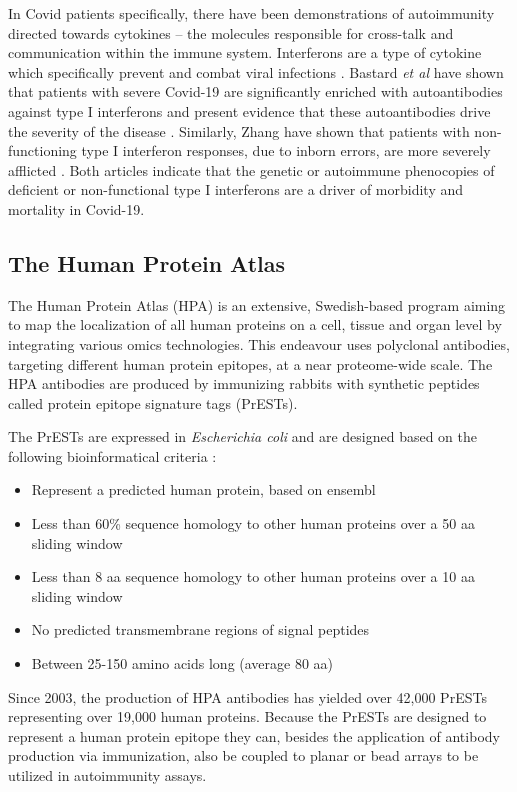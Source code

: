 \documentclass{article}
\begin{document}
In Covid patients specifically, there have been demonstrations of autoimmunity directed towards cytokines – the molecules responsible for cross-talk and communication within the immune system. Interferons are a type of cytokine which specifically prevent and combat viral infections \cite{ifn}. Bastard \textit{et al} have shown that patients with severe Covid-19 are significantly enriched with autoantibodies against type I interferons and present evidence that these autoantibodies drive the severity of the disease \cite{bastard}. Similarly, Zhang  have shown that patients with non-functioning type I interferon responses, due to inborn errors, are more severely afflicted \cite{zhang_inborn_2020}. Both articles indicate that the genetic or autoimmune phenocopies of deficient or non-functional type I interferons are a driver of morbidity and mortality in Covid-19.

\subsection{The Human Protein Atlas}
The Human Protein Atlas (HPA) \cite{hpa} is an extensive, Swedish-based program aiming to map the localization of all human proteins on a cell, tissue and organ level by integrating various omics technologies. This endeavour uses polyclonal antibodies, targeting different human protein epitopes, at a near proteome-wide scale. The HPA antibodies are produced by immunizing rabbits with synthetic peptides called protein epitope signature tags (PrESTs). 

The PrESTs are expressed in \textit{Escherichia coli} and are designed based on the following bioinformatical criteria \cite{prest}:

\begin{itemize}
    \item Represent a predicted human protein, based on ensembl \cite{ensembl}
    \item Less than 60\% sequence homology to other human proteins over a 50 aa sliding window
    \item Less than 8 aa sequence homology to other human proteins over a 10 aa sliding window
    \item No predicted transmembrane regions of signal peptides
    \item Between 25-150 amino acids long (average 80 aa)
\end{itemize}

Since 2003, the production of HPA antibodies has yielded over 42,000 PrESTs representing over 19,000 human proteins. Because the PrESTs are designed to represent a human protein epitope they can, besides the application of antibody production via immunization, also be coupled to planar or bead arrays to be utilized in autoimmunity assays.
\end{document}
